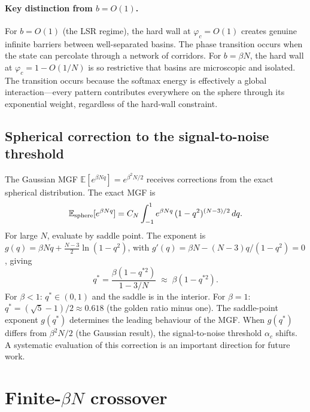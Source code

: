 \documentclass[11pt]{article}
\newcommand{\vp}{\varphi}
\begin{document}
\paragraph{Key distinction from $b = O(1)$.}
For $b = O(1)$ (the LSR regime), the hard wall at $\vp_c = O(1)$
creates genuine infinite barriers between well-separated basins.
The phase transition occurs when the state can percolate
through a network of corridors.
For $b = \beta N$, the hard wall at $\vp_c = 1 - O(1/N)$ is
so restrictive that basins are microscopic and isolated.
The transition occurs because the softmax energy is effectively
a global interaction---every pattern contributes everywhere on
the sphere through its exponential weight, regardless of the
hard-wall constraint.

\subsection{Spherical correction to the signal-to-noise threshold}

The Gaussian MGF $\mathbb{E}[e^{\beta N q}] = e^{\beta^2 N/2}$
receives corrections from the exact spherical distribution.
The exact MGF is
\begin{equation}\label{eq:MGF_sphere}
  \mathbb{E}_{\rm sphere}[e^{\beta N q}]
  = C_N \int_{-1}^{1} e^{\beta N q}\,(1-q^2)^{(N-3)/2}\,dq.
\end{equation}
For large $N$, evaluate by saddle point.  The exponent is
$g(q) = \beta N q + \tfrac{N-3}{2}\ln(1 - q^2)$,
with $g'(q) = \beta N - (N{-}3)q/(1-q^2) = 0$, giving
\begin{equation}\label{eq:saddle}
  q^* = \frac{\beta(1 - q^{*2})}{1 - 3/N}
  \;\approx\; \beta(1 - q^{*2}).
\end{equation}
For $\beta < 1$: $q^* \in (0, 1)$ and the saddle is in the
interior.
For $\beta = 1$: $q^* = (\sqrt{5}-1)/2 \approx 0.618$
(the golden ratio minus one).
The saddle-point exponent $g(q^*)$ determines the leading
behaviour of the MGF.  When $g(q^*)$ differs from
$\beta^2 N/2$ (the Gaussian result), the signal-to-noise
threshold $\alpha_c$ shifts.
A systematic evaluation of this correction is an important
direction for future work.


\section{Finite-$\beta N$ crossover}
\label{sec:crossover}
\end{document}
